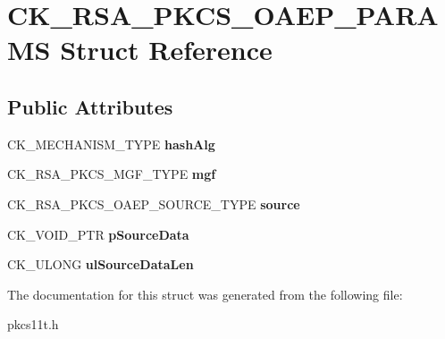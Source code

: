 \hypertarget{struct_c_k___r_s_a___p_k_c_s___o_a_e_p___p_a_r_a_m_s}{}\section{C\+K\+\_\+\+R\+S\+A\+\_\+\+P\+K\+C\+S\+\_\+\+O\+A\+E\+P\+\_\+\+P\+A\+R\+A\+MS Struct Reference}
\label{struct_c_k___r_s_a___p_k_c_s___o_a_e_p___p_a_r_a_m_s}
\subsection*{Public Attributes}
\begin{DoxyCompactItemize}
\item 
\mbox{\label{struct_c_k___r_s_a___p_k_c_s___o_a_e_p___p_a_r_a_m_s_a830f53e5a9c6b02bacaf1de3f18355ad}} 
C\+K\+\_\+\+M\+E\+C\+H\+A\+N\+I\+S\+M\+\_\+\+T\+Y\+PE {\bfseries hash\+Alg}
\item 
\mbox{\label{struct_c_k___r_s_a___p_k_c_s___o_a_e_p___p_a_r_a_m_s_ad315447d7714ea28f1a920a4b65c0c22}} 
C\+K\+\_\+\+R\+S\+A\+\_\+\+P\+K\+C\+S\+\_\+\+M\+G\+F\+\_\+\+T\+Y\+PE {\bfseries mgf}
\item 
\mbox{\label{struct_c_k___r_s_a___p_k_c_s___o_a_e_p___p_a_r_a_m_s_a9e3d19a611b80dd8e9c20d94428d90eb}} 
C\+K\+\_\+\+R\+S\+A\+\_\+\+P\+K\+C\+S\+\_\+\+O\+A\+E\+P\+\_\+\+S\+O\+U\+R\+C\+E\+\_\+\+T\+Y\+PE {\bfseries source}
\item 
\mbox{\label{struct_c_k___r_s_a___p_k_c_s___o_a_e_p___p_a_r_a_m_s_adcf064c32570d5a83461f6bdee278f87}} 
C\+K\+\_\+\+V\+O\+I\+D\+\_\+\+P\+TR {\bfseries p\+Source\+Data}
\item 
\mbox{\label{struct_c_k___r_s_a___p_k_c_s___o_a_e_p___p_a_r_a_m_s_ad292b329d2fa340bb1523547addcd9ec}} 
C\+K\+\_\+\+U\+L\+O\+NG {\bfseries ul\+Source\+Data\+Len}
\end{DoxyCompactItemize}


The documentation for this struct was generated from the following file\+:\begin{DoxyCompactItemize}
\item 
pkcs11t.\+h\end{DoxyCompactItemize}
